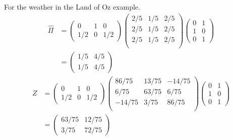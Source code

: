 \documentclass[12pt]{article}
\begin{document}
\begin{example}
    For the weather in the Land of Oz example.
    \begin{align*}
        \hat{\Pi} &=
        \begin{pmatrix}
            0 & 1 & 0 \\
            1/2 & 0 & 1/2
        \end{pmatrix}
        \begin{pmatrix}
            2/5 & 1/5 & 2/5 \\
            2/5 & 1/5 & 2/5 \\
            2/5 & 1/5 & 2/5 \\
        \end{pmatrix}
        \begin{pmatrix}
            0 & 1 \\
            1 & 0 \\
            0 & 1
        \end{pmatrix}
        \\
        & =
        \begin{pmatrix}
            1/5 & 4/5 \\
            1/5 & 4/5
        \end{pmatrix}
          \end{align*}
          \begin{align*}
        Z &=
        \begin{pmatrix}
            0 & 1 & 0 \\
            1/2 & 0 & 1/2
        \end{pmatrix}
        \begin{pmatrix}
            86/75 & 13/75 & -14/75 \\
            6/75 & 63/75 & 6/75 \\
            -14/75 & 3/75 & 86/75 \\
        \end{pmatrix}
        \begin{pmatrix}
            0 & 1 \\
            1 & 0 \\
            0 & 1
        \end{pmatrix}
        \\
        & =
        \begin{pmatrix}
            63/75 & 12/75 \\
            3/75 & 72/75
        \end{pmatrix}
          \end{align*}

\end{example}
\end{document}
